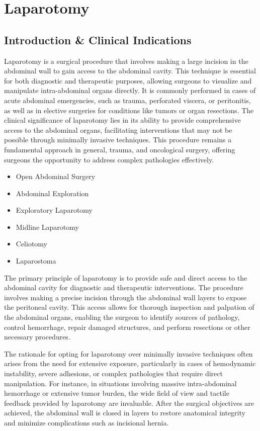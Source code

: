 \chapter{Laparotomy}

\section*{Introduction \& Clinical Indications}
Laparotomy is a surgical procedure that involves making a large incision in the abdominal wall to gain access to the abdominal cavity. This technique is essential for both diagnostic and therapeutic purposes, allowing surgeons to visualize and manipulate intra-abdominal organs directly. It is commonly performed in cases of acute abdominal emergencies, such as trauma, perforated viscera, or peritonitis, as well as in elective surgeries for conditions like tumors or organ resections. The clinical significance of laparotomy lies in its ability to provide comprehensive access to the abdominal organs, facilitating interventions that may not be possible through minimally invasive techniques. This procedure remains a fundamental approach in general, trauma, and oncological surgery, offering surgeons the opportunity to address complex pathologies effectively.

\begin{itemize}
  \item Open Abdominal Surgery
  \item Abdominal Exploration
  \item Exploratory Laparotomy
  \item Midline Laparotomy
  \item Celiotomy
  \item Laparostoma
\end{itemize}

The primary principle of laparotomy is to provide safe and direct access to the abdominal cavity for diagnostic and therapeutic interventions. The procedure involves making a precise incision through the abdominal wall layers to expose the peritoneal cavity. This access allows for thorough inspection and palpation of the abdominal organs, enabling the surgeon to identify sources of pathology, control hemorrhage, repair damaged structures, and perform resections or other necessary procedures.

The rationale for opting for laparotomy over minimally invasive techniques often arises from the need for extensive exposure, particularly in cases of hemodynamic instability, severe adhesions, or complex pathologies that require direct manipulation. For instance, in situations involving massive intra-abdominal hemorrhage or extensive tumor burden, the wide field of view and tactile feedback provided by laparotomy are invaluable. After the surgical objectives are achieved, the abdominal wall is closed in layers to restore anatomical integrity and minimize complications such as incisional hernia.

